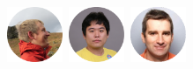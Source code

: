 \documentclass{beamer}
\begin{document}
\begin{frame}
\begin{itemize}
\begin{center}
            \includegraphics[width=0.125\textwidth]{figures/faces/tim.png}\
            \includegraphics[width=0.125\textwidth]{figures/faces/cho.png}\
            \includegraphics[width=0.125\textwidth]{figures/faces/david.png}
        \end{center}
    \end{itemize}
\end{frame}
\end{document}
